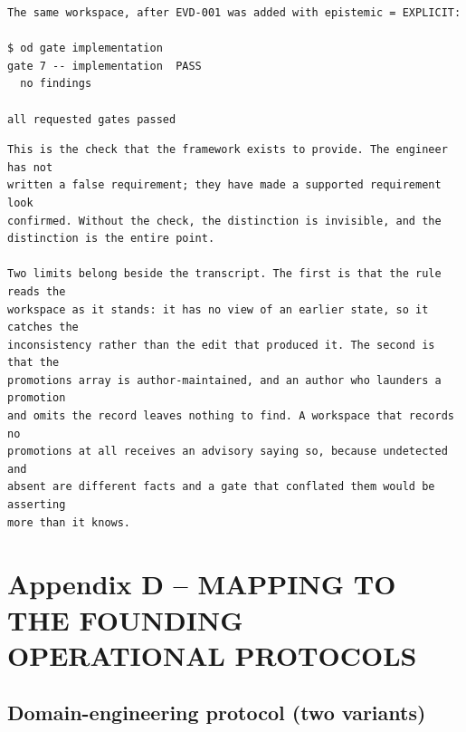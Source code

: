 \documentclass[11pt,a4paper]{article}
\begin{document}
\begin{Verbatim}[fontsize=\footnotesize,breaklines=true,breakanywhere=true,breakautoindent=false,samepage=false]
The same workspace, after EVD-001 was added with epistemic = EXPLICIT:

$ od gate implementation
gate 7 -- implementation  PASS
  no findings

all requested gates passed
\end{Verbatim}

\begin{Verbatim}[fontsize=\footnotesize,breakanywhere=true,breaklines=true,breakautoindent=false,samepage=false]
This is the check that the framework exists to provide. The engineer has not
written a false requirement; they have made a supported requirement look
confirmed. Without the check, the distinction is invisible, and the
distinction is the entire point.

Two limits belong beside the transcript. The first is that the rule reads the
workspace as it stands: it has no view of an earlier state, so it catches the
inconsistency rather than the edit that produced it. The second is that the
promotions array is author-maintained, and an author who launders a promotion
and omits the record leaves nothing to find. A workspace that records no
promotions at all receives an advisory saying so, because undetected and
absent are different facts and a gate that conflated them would be asserting
more than it knows.
\end{Verbatim}

\section{Appendix D -- MAPPING TO THE FOUNDING OPERATIONAL PROTOCOLS}

\subsection{Domain-engineering protocol (two variants)}
\end{document}
